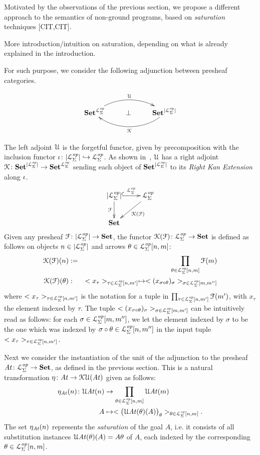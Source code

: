  Motivated by the observations of the previous section, we propose a different approach to the semantics of non-ground programs, based on \emph{saturation} techniques [CIT,CIT].

\begin{todo} More introduction/intuition on saturation, depending on what is already explained in the introduction. \end{todo}

For such purpose, we consider the following adjunction between presheaf categories.

$$\xymatrix{\prsh{\Lw} \ar@(ur,ul)[rr]^{\U} &\bot & \ar@(dl,dr)[ll]^{\K} \prsh{|\Lw|}}$$

The left adjoint $\mathcal{U}$ is the forgetful functor, given by precomposition with the inclusion functor
$\iota\colon |\mathcal{L}^{\mathit{op}}_{\Sigma}| \hookrightarrow \mathcal{L}^{\mathit{op}}_{\Sigma}$. As shown in~\cite[X, Th. 1, Cor. 2]{mclane}, $\mathcal{U}$ has a right adjoint $\mathcal{K}\colon \mathbf{Set}^{|\mathcal{L}^{\mathit{op}}_{\Sigma}|}\to \mathbf{Set}^{\mathcal{L}^{\mathit{op}}_{\Sigma}}$ sending each object of $\mathbf{Set}^{|\mathcal{L}^{\mathit{op}}_{\Sigma}|}$ to its \emph{Right Kan Extension} along $\iota$.
\[\xymatrix{|\Lw| \ar@{^{(}->}[r]^{\Lw} \ar[d]_{\F}&  \Lw \ar[ld]^{\K(\F)}\\
 \set}\]
Given any presheaf $\mathcal{F} \colon |\mathcal{L}^{\mathit{op}}_{\Sigma}| \to \mathbf{Set}$, the functor $\mathcal{K}(\mathcal{F}) \colon \mathcal{L}^{\mathit{op}}_{\Sigma} \to \mathbf{Set}$ is defined as follows on objects $n \in |\mathcal{L}^{\mathit{op}}_{\Sigma}|$ and arrows $\theta \in \mathcal{L}^{\mathit{op}}_{\Sigma}[n,m]$:
\begin{eqnarray*}
  \mathcal{K}(\mathcal{F})(n) &:=& \prod_{\theta \in \mathcal{L}^{\mathit{op}}_{\Sigma}[n,m]} \mathcal{F} (m) \\
  \mathcal{K}(\mathcal{F})(\theta) &:& < x_{\tau}>_{\tau \in \mathcal{L}^{\mathit{op}}_{\Sigma}[n,m']} \mapsto <(x_{\sigma\circ\theta})_\sigma>_{\sigma \in \mathcal{L}^{\mathit{op}}_{\Sigma}[m,m'']}
\end{eqnarray*}
where $< x_{\tau}>_{\tau \in \mathcal{L}^{\mathit{op}}_{\Sigma}[n,m']}$ is the notation for a tuple in $\prod_{\tau \in \mathcal{L}^{\mathit{op}}_{\Sigma}[n,m']} \mathcal{F} (m')$, with $x_{\tau}$ the element indexed by $\tau$. The tuple $<(x_{\sigma\circ\theta})_\sigma>_{\sigma \in \mathcal{L}^{\mathit{op}}_{\Sigma}[m,m']}$ can be intuitively read as follows: for each $\sigma \in \mathcal{L}^{\mathit{op}}_{\Sigma}[m,m'']$, we let the element indexed by $\sigma$ to be the one which was indexed by $\sigma\circ\theta \in \mathcal{L}^{\mathit{op}}_{\Sigma}[n,m'']$ in the input tuple $< x_{\tau}>_{\tau \in \mathcal{L}^{\mathit{op}}_{\Sigma}[n,m']}$.

Next we consider the instantiation of the unit of the adjunction to the presheaf $\mathit{At} \colon \mathcal{L}^{\mathit{op}}_{\Sigma} \to \mathbf{Set}$, as defined in the previous section. This is a natural transformation $\eta\colon \mathit{At} \to \mathcal{K}\mathcal{U}(\mathit{At})$ given as follows:
\begin{align}\label{Eq:unit_satAdj}
  \eta_{\mathit{At}} (n)\colon \mathcal{U} \mathit{At}(n) & \to \prod_{\theta \in \mathcal{L}^{\mathit{op}}_{\Sigma}[n,m]} \mathcal{U} \mathit{At} (m) \nonumber \\
  A & \mapsto < \big(\mathcal{U}\mathit{At}(\theta)(A)\big)_{\theta}>_{\theta \in \mathcal{L}^{\mathit{op}}_{\Sigma}[n,m]}.
\end{align}
The set $\eta_{\mathit{At}} (n)$ represents the \emph{saturation} of the goal $A$, i.e. it consists of all substitution instances $\mathcal{U} \mathit{At}(\theta)(A) = A \theta$ of $A$, each indexed by the corresponding $\theta \in \mathcal{L}^{\mathit{op}}_{\Sigma}[n,m]$.

